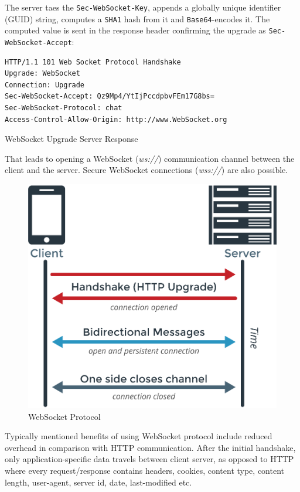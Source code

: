 \documentclass{uvamscse}
\begin{document}
The server taes the \texttt{Sec-WebSocket-Key}, appends a globally unique identifier (GUID) string, computes a \texttt{SHA1} hash from it and \texttt{Base64}-encodes it. The computed value is sent in the response header confirming the upgrade as \texttt{Sec-WebSocket-Accept}:

\begin{sourcecode}
\begin{lstlisting}[style=mono]
HTTP/1.1 101 Web Socket Protocol Handshake
Upgrade: WebSocket
Connection: Upgrade
Sec-WebSocket-Accept: Qz9Mp4/YtIjPccdpbvFEm17G8bs=
Sec-WebSocket-Protocol: chat
Access-Control-Allow-Origin: http://www.WebSocket.org
\end{lstlisting}
\caption{WebSocket Upgrade Server Response}
\end{sourcecode}

That leads to opening a WebSocket (\textit{ws://}) communication channel between the client and the server. Secure WebSocket connections (\textit{wss://}) are also possible.

\begin{figure}[H]
\centering
\includegraphics[scale=0.3]{ws}
\caption{WebSocket Protocol}
\end{figure}

Typically mentioned benefits of using WebSocket protocol include reduced overhead in comparison with HTTP communication. After the initial handshake, only application-specific data travels between client server, as opposed to HTTP where every request/response contains headers, cookies, content type, content length, user-agent, server id, date, last-modified etc.
\end{document}
